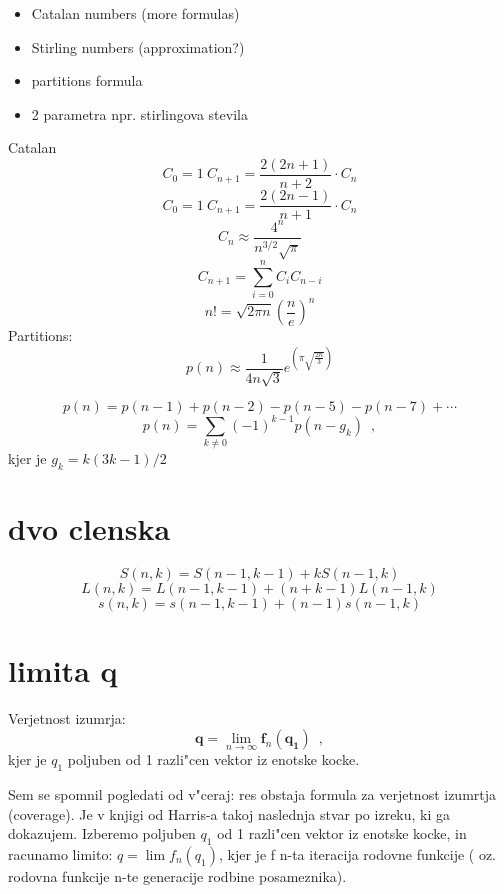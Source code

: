 \documentclass{article}
\begin{document}
    \begin{itemize}	
        \item Catalan numbers (more formulas)
        \item Stirling numbers  (approximation?)
        \item partitions formula 
        \item 2 parametra npr. stirlingova stevila
    \end{itemize}	
   Catalan \\
   \[ C_0 = 1 \ C_{n+1} = \frac{2(2n+1)}{n+2} \cdot C_{n} \]
   \[ C_0 = 1 \ C_{n+1} = \frac{2(2n-1)}{n+1} \cdot C_{n} \]
   \[ C_n \approx \frac{4^n}{n^{3/2}\sqrt{\pi}} \]
   \[ C_{n+1} = \sum_{i=0}^{n} C_i C_{n-i} \]
   \[ n! =  \sqrt{2\pi n} (\frac{n}{e})^n  \]
   Partitions:\\
    \[ p(n) \approx 
     \frac{1}{4n\sqrt{3}}
      e^{(\pi \sqrt{\frac{2n}{3}})} \]

    \[ p(n) = p(n-1) + p(n-2) - p(n-5) - p(n-7) + \cdots \]
    \[ p(n) = \sum_{k \ne 0} (-1)^{k-1} p(n-g_k) \enspace , \]
    kjer je \( g_k = k(3k-1)/2 \)
    \section{dvo clenska}
        \[ S(n, k) = S(n-1, k-1) + k S(n-1, k) \]
        \[ L(n, k) = L(n-1, k-1) + (n+k-1) L(n-1, k) \]
        \[ s(n, k) = s(n-1, k-1) + (n-1) s(n-1, k) \]
   


   \section{limita q}
   Verjetnost izumrja: \\
   \[ \mathbf{q} = \lim_{n\to\infty} \mathbf{f}_{n}(\mathbf{q_1}) \enspace , \]
   kjer je $q_1$ poljuben od 1 razli"cen vektor iz enotske kocke.
   

   Sem se spomnil pogledati od v"ceraj: res obstaja formula za verjetnost izumrtja 
   (coverage). Je v knjigi od Harris-a takoj naslednja stvar po izreku, ki ga dokazujem.
   Izberemo poljuben $q_1$ od 1 razli"cen vektor iz enotske kocke, in racunamo limito:
    $ q = \lim f_n(q_1) $, kjer je f n-ta iteracija rodovne funkcije
   ( oz. rodovna funkcije n-te generacije rodbine posameznika).
   
\end{document}
